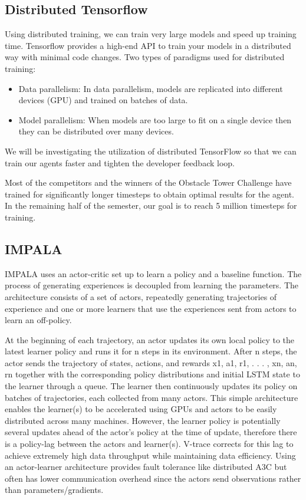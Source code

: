 \documentclass[conference]{IEEEtran}
\begin{document}
\subsection{\textbf{Distributed Tensorflow}}

Using distributed training, we can train very large models and speed up training time. Tensorflow provides a high-end API to train your models in a distributed way with minimal code changes.  Two types of paradigms used for distributed training:
\begin{itemize}
\item Data parallelism: In data parallelism, models are replicated into different devices (GPU) and trained on batches of data.
\item Model parallelism: When models are too large to fit on a single device then they can be distributed over many devices.
\end{itemize}
We will be investigating the utilization of distributed TensorFlow so that we can train our agents faster and tighten the developer feedback loop.

Most of the competitors and the winners of the Obstacle Tower Challenge have trained for significantly longer timesteps to obtain optimal results for the agent. In the remaining half of the semester, our goal is to reach 5 million timesteps for training.

\subsection{\textbf{IMPALA}}

IMPALA uses an actor-critic set up to learn a policy and a baseline function. The process of generating experiences is decoupled from learning the parameters. The architecture consists of a set of actors, repeatedly generating trajectories of experience and one or more learners that use the experiences sent from actors to learn an off-policy.

At the beginning of each trajectory, an actor updates its own local policy to the latest learner policy and runs it for n steps in its environment. After n steps, the actor sends the trajectory of states, actions, and rewards x1, a1, r1, . . . , xn, an, rn together with the corresponding policy distributions and initial LSTM state to the learner through a queue. The learner then continuously updates its policy on batches of trajectories, each collected from many actors. This simple architecture enables the learner(s) to be accelerated using GPUs and actors to be easily distributed across many machines. However, the learner policy is potentially several updates ahead of the actor’s policy at the time of update, therefore there is a policy-lag between the actors and learner(s). V-trace corrects for this lag to achieve extremely high data throughput while maintaining data efficiency. Using an actor-learner architecture provides fault tolerance like distributed A3C but often has lower communication overhead since the actors send observations rather than parameters/gradients.
\end{document}
